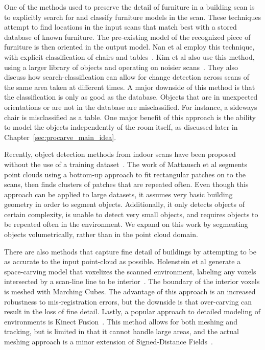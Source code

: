 \documentclass[12pt,onecolumn,oneside]{book}
\begin{document}
One of the methods used to preserve the detail of furniture in a building scan is to explicitly search for and classify furniture models in the scan.  These techniques attempt to find locations in the input scans that match best with a stored database of known furniture.  The pre-existing model of the recognized piece of furniture is then oriented in the output model.  Nan et al employ this technique, with explicit classification of chairs and tables~\cite{SearchClassifyPointcloud}.  Kim et al also use this method, using a larger library of objects and operating on noisier scans~\cite{Kim12}.  They also discuss how search-classification can allow for change detection across scans of the same area taken at different times.  A major downside of this method is that the classification is only as good as the database.  Objects that are in unexpected orientations or are not in the database are misclassified.  For instance, a sideways chair is misclassified as a table.  One major benefit of this approach is the ability to model the objects independently of the room itself, as discussed later in Chapter~\ref{sec:procarve_main_idea}.  

Recently, object detection methods from indoor scans have been proposed without the use of a training dataset~\cite{ObjectDiscovery13,Mattausch14}.  The work of Mattausch et al segments point clouds using a bottom-up approach to fit rectangular patches on to the scans, then finds clusters of patches that are repeated often.  Even though this approach can be applied to large datasets, it assumes very basic building geometry in order to segment objects.  Additionally, it only detects objects of certain complexity, is unable to detect very small objects, and requires objects to be repeated often in the environment.  We expand on this work by segmenting objects volumetrically, rather than in the point cloud domain.

There are also methods that capture fine detail of buildings by attempting to be as accurate to the input point-cloud as possible.  Holenstein et al generate a space-carving model that voxelizes the scanned environment, labeling any voxels intersected by a scan-line line to be interior~\cite{Carving}.  The boundary of the interior voxels is meshed with Marching Cubes.  The advantage of this approach is an increased robustness to mis-registration errors, but the downside is that over-carving can result in the loss of fine detail.  Lastly, a popular approach to detailed modeling of environments is Kinect Fusion~\cite{KinectFusion,Kintinuous}.  This method allows for both meshing and tracking, but is limited in that it cannot handle large areas, and the actual meshing approach is a minor extension of Signed-Distance Fields~\cite{SignedDistanceFields}. 
\end{document}
